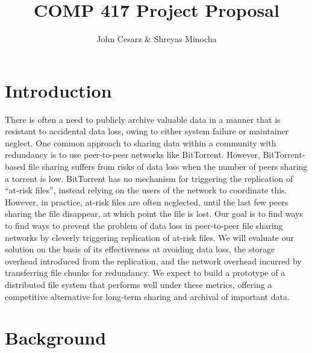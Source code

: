 \documentclass[twocolumn]{article}
\title{COMP 417 Project Proposal}
\author{John Cesarz \& Shreyas Minocha}
\begin{document}
\maketitle

\section{Introduction}

There is often a need to publicly archive valuable data in a manner that is resistant to accidental data loss, owing to either system failure or maintainer neglect.
%
One common approach to sharing data within a community with redundancy is to use peer-to-peer networks like BitTorrent.
However, BitTorrent-based file sharing suffers from risks of data loss when the number of peers sharing a torrent is low.
BitTorrent has no mechanism for triggering the replication of ``at-risk files'', instead relying on the users of the network to coordinate this.
However, in practice, at-risk files are often neglected, until the last few peers sharing the file disappear, at which point the file is lost.
%
Our goal is to find ways to find ways to prevent the problem of data loss in peer-to-peer file sharing networks by cleverly triggering replication of at-risk files.
%
%
%
We will evaluate our solution on the basis of its effectiveness at avoiding data loss, the storage overhead introduced from the replication, and the network overhead incurred by transferring file chunks for redundancy.
%
We expect to build a prototype of a distributed file system that performs well under these metrics, offering a competitive alternative for long-term sharing and archival of important data.

\section{Background}


\lipsum[2]
\end{document}
